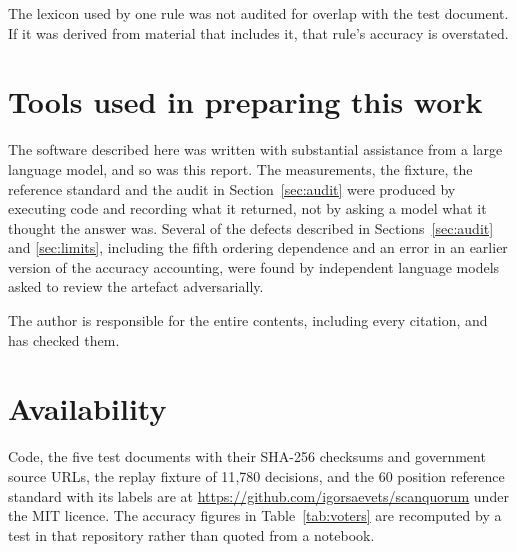 \documentclass[11pt,a4paper]{article}
\begin{document}
The lexicon used by one rule was not audited for overlap with the test document. If it
was derived from material that includes it, that rule's accuracy is overstated.

\section{Tools used in preparing this work}

The software described here was written with substantial assistance from a large language
model, and so was this report. The measurements, the fixture, the reference standard and the
audit in Section~\ref{sec:audit} were produced by executing code and recording what it
returned, not by asking a model what it thought the answer was. Several of the defects
described in Sections~\ref{sec:audit} and \ref{sec:limits}, including the fifth ordering
dependence and an error in an earlier version of the accuracy accounting, were found by
independent language models asked to review the artefact adversarially.

The author is responsible for the entire contents, including every citation, and has checked
them.

\section{Availability}

Code, the five test documents with their SHA-256 checksums and government source URLs,
the replay fixture of 11{,}780 decisions, and the 60 position reference standard with its
labels are at \url{https://github.com/igorsaevets/scanquorum} under the MIT licence. The
accuracy figures in Table~\ref{tab:voters} are recomputed by a test in that repository
rather than quoted from a notebook.
\end{document}
